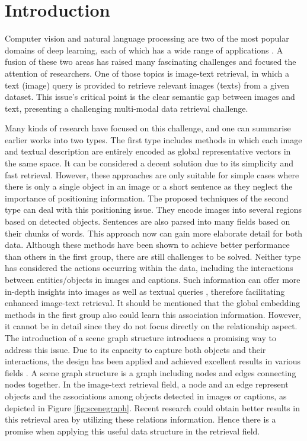 \documentclass{IOS-Book-Article}
\begin{document}
\section{Introduction}
Computer vision and natural language processing are two of the most popular domains of deep learning, each of which has a wide range of applications \cite{duy2018accurate,Shih3DP20,johnson2017google}. A fusion of these two areas has raised many fascinating challenges and focused the attention of researchers. One of those topics is image-text retrieval, in which a text (image) query is provided to retrieve relevant images (texts) from a given dataset. This issue's critical point is the clear semantic gap between images and text, presenting a challenging multi-modal data retrieval challenge.

Many kinds of research have focused on this challenge, and one can summarise earlier works into two types. The first type includes methods \cite{faghri2017vse++,wang2017adversarial,zheng2020dualpath} in which each image and textual description are entirely encoded as global representative vectors in the same space. It can be considered a decent solution due to its simplicity and fast retrieval. However, these approaches are only suitable for simple cases where there is only a single object in an image or a short sentence as they neglect the importance of positioning information. The proposed techniques \cite{huang2018learning,lee2018stacked,wang2019position} of the second type can deal with this positioning issue. They encode images into several regions based on detected objects. Sentences are also parsed into many fields based on their chunks of words. This approach now can gain more elaborate detail for both data. Although these methods have been shown to achieve better performance than others in the first group, there are still challenges to be solved. Neither type has considered the actions occurring within the data, including the interactions between entities/objects in images and captions. Such information can offer more in-depth insights into images as well as textual queries \cite{johnson2015image}, therefore facilitating enhanced image-text retrieval. It should be mentioned that the global embedding methods in the first group also could learn this association information. However, it cannot be in detail since they do not focus directly on the relationship aspect. The introduction of a scene graph structure \cite{johnson2015image} introduces a promising way to address this issue. Due to its capacity to capture both objects and their interactions, the design has been applied and achieved excellent results in various fields \cite{johnson2018image,xu2019scene,anderson2016spice,mmm2021graph}. A scene graph structure is a graph including nodes and edges connecting nodes together. In the image-text retrieval field, a node and an edge represent objects and the associations among objects detected in images or captions, as depicted in Figure \ref{fig:scenegraph}. Recent research \cite{wang2020cross, shi2019knowledge} could obtain better results in this retrieval area by utilizing these relations information. Hence there is a promise when applying this useful data structure in the retrieval field.
\end{document}
